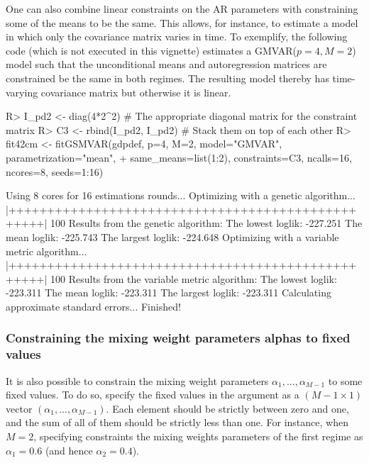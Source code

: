 \documentclass[nojss]{jss}
\begin{document}
One can also combine linear constraints on the AR parameters with constraining some of the means to be the same. This allows, for instance, to estimate a model in which only the covariance matrix varies in time. To exemplify, the following code (which is not executed in this vignette) estimates a GMVAR($p=4, M=2$) model such that the unconditional means and autoregression matrices are constrained be the same in both regimes. The resulting model thereby has time-varying covariance matrix but otherwise it is linear.
%
\begin{CodeChunk}
\begin{CodeInput}
R> I_pd2 <- diag(4*2^2) # The appropriate diagonal matrix for the constraint matrix
R> C3 <- rbind(I_pd2, I_pd2) # Stack them on top of each other
R> fit42cm <- fitGSMVAR(gdpdef, p=4, M=2, model="GMVAR", parametrization="mean",
+    same_means=list(1:2), constraints=C3, ncalls=16, ncores=8, seeds=1:16)
\end{CodeInput}
\begin{CodeOutput}
Using 8 cores for 16 estimations rounds...
Optimizing with a genetic algorithm...
  |++++++++++++++++++++++++++++++++++++++++++++++++++| 100%
Results from the genetic algorithm:
The lowest loglik:  -227.251
The mean loglik:    -225.743
The largest loglik: -224.648
Optimizing with a variable metric algorithm...
  |++++++++++++++++++++++++++++++++++++++++++++++++++| 100%
Results from the variable metric algorithm:
The lowest loglik:  -223.311
The mean loglik:    -223.311
The largest loglik: -223.311
Calculating approximate standard errors...
Finished!
\end{CodeOutput}
\end{CodeChunk}
%

\subsubsection{Constraining the mixing weight parameters alphas to fixed values}
It is also possible to constrain the mixing weight parameters $\alpha_1,...,\alpha_{M-1}$ to some fixed values. To do so, specify the fixed values in the argument  as a $(M-1\times 1)$ vector $(\alpha_1,...,\alpha_{M-1})$. Each element should be strictly between zero and one, and the sum of all of them should be strictly less than one. For instance, when $M=2$, specifying  constraints the mixing weights parameters of the first regime as $\alpha_1=0.6$ (and hence $\alpha_2=0.4$).
\end{document}
